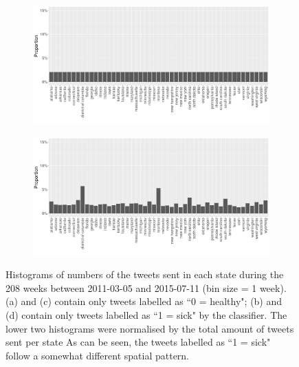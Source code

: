 \documentclass[11pt, a4paper]{report}\usepackage[]{graphicx}\usepackage[]{color}
\begin{document}
\begin{figure}[H]
    \begin{subfigure}[t]{0.49\textwidth}
  \includegraphics[width=1\linewidth]{activity_rel_healthy_statename_Twitter_full_aggregated.png}
  \caption{}
  \end{subfigure}
  \hfill
    \begin{subfigure}[t]{0.49\textwidth}
  \includegraphics[width=1\linewidth]{activity_rel_sick_statename_Twitter_full_aggregated.png}
  \caption{}
  \end{subfigure}
  \caption{Histograms of numbers of the tweets sent in each state during the 208 weeks between 2011-03-05 and 2015-07-11 (bin size = 1 week). (a) and (c) contain only tweets labelled as ``0 = healthy"; (b) and (d) contain only tweets labelled as ``1 = sick" by the classifier. The lower two histograms were normalised by the total amount of tweets sent per state As can be seen, the tweets labelled as ``1 = sick" follow a somewhat different spatial pattern.}
  \label{fig:tweets_state_healthy_sick}
\end{figure}
\end{document}

